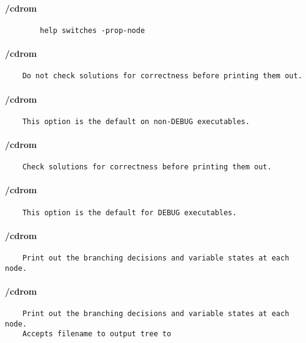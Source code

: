 \paragraph{/cdrom}
{\footnotesize
\begin{verbatim}
        help switches -prop-node
\end{verbatim}
}
\paragraph{/cdrom}
{\footnotesize
\begin{verbatim}
    Do not check solutions for correctness before printing them out.
\end{verbatim}
}
\paragraph{/cdrom}
{\footnotesize
\begin{verbatim}
    This option is the default on non-DEBUG executables.
\end{verbatim}
}
\paragraph{/cdrom}
{\footnotesize
\begin{verbatim}
    Check solutions for correctness before printing them out.
\end{verbatim}
}
\paragraph{/cdrom}
{\footnotesize
\begin{verbatim}
    This option is the default for DEBUG executables.
\end{verbatim}
}
\paragraph{/cdrom}
{\footnotesize
\begin{verbatim}
    Print out the branching decisions and variable states at each node.
\end{verbatim}
}
\paragraph{/cdrom}
{\footnotesize
\begin{verbatim}
    Print out the branching decisions and variable states at each node.
    Accepts filename to output tree to
\end{verbatim}
}
